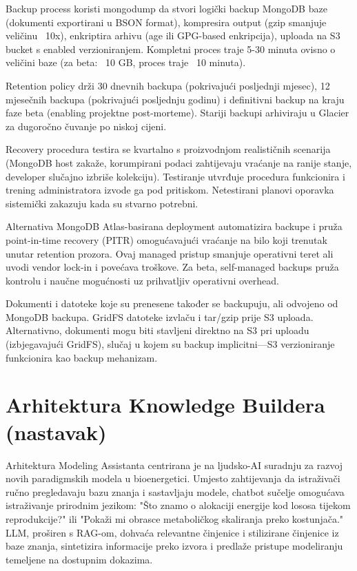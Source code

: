 \documentclass[12pt,a4paper]{article}
\begin{document}
Backup process koristi mongodump da stvori logički backup MongoDB baze (dokumenti exportirani u BSON format), kompresira output (gzip smanjuje veličinu ~10x), enkriptira arhivu (age ili GPG-based enkripcija), uploada na S3 bucket s enabled verzioniranjem. Kompletni proces traje 5-30 minuta ovisno o veličini baze (za beta: ~10 GB, proces traje ~10 minuta).

Retention policy drži 30 dnevnih backupa (pokrivajući posljednji mjesec), 12 mjesečnih backupa (pokrivajući posljednju godinu) i definitivni backup na kraju faze beta (enabling projektne post-morteme). Stariji backupi arhiviraju u Glacier za dugoročno čuvanje po niskoj cijeni.

Recovery procedura testira se kvartalno s proizvodnjom realističnih scenarija (MongoDB host zakaže, korumpirani podaci zahtijevaju vraćanje na ranije stanje, developer slučajno izbriše kolekciju). Testiranje utvrđuje procedura funkcionira i trening administratora izvode ga pod pritiskom. Netestirani planovi oporavka sistemički zakazuju kada su stvarno potrebni.

Alternativa MongoDB Atlas-basirana deployment automatizira backupe i pruža point-in-time recovery (PITR) omogućavajući vraćanje na bilo koji trenutak unutar retention prozora. Ovaj managed pristup smanjuje operativni teret ali uvodi vendor lock-in i povećava troškove. Za beta, self-managed backups pruža kontrolu i naučne mogućnosti uz prihvatljiv operativni overhead.

Dokumenti i datoteke koje su prenesene također se backupuju, ali odvojeno od MongoDB backupa. GridFS datoteke izvlaču i tar/gzip prije S3 uploada. Alternativno, dokumenti mogu biti stavljeni direktno na S3 pri uploadu (izbjegavajući GridFS), slučaj u kojem su backup implicitni—S3 verzioniranje funkcionira kao backup mehanizam.


\section{Arhitektura Knowledge Buildera (nastavak)}

Arhitektura Modeling Assistanta centrirana je na ljudsko-AI suradnju za razvoj novih paradigmskih modela u bioenergetici. Umjesto zahtijevanja da istraživači ručno pregledavaju bazu znanja i sastavljaju modele, chatbot sučelje omogućava istraživanje prirodnim jezikom: "Što znamo o alokaciji energije kod lososa tijekom reprodukcije?" ili "Pokaži mi obrasce metaboličkog skaliranja preko kostunjača." LLM, proširen s RAG-om, dohvaća relevantne činjenice i stilizirane činjenice iz baze znanja, sintetizira informacije preko izvora i predlaže pristupe modeliranju temeljene na dostupnim dokazima.
\end{document}
